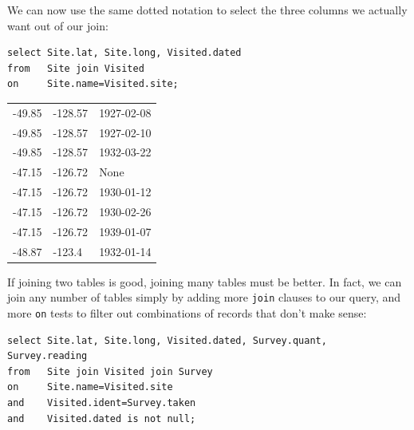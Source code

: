 \documentclass{book}
\begin{document}
We can now use the same dotted notation to select the three columns we
actually want out of our join:

\begin{verbatim}
select Site.lat, Site.long, Visited.dated
from   Site join Visited
on     Site.name=Visited.site;
\end{verbatim}

\begin{tabular}{lll}
-49.85 & -128.57 & 1927-02-08 \\
-49.85 & -128.57 & 1927-02-10 \\
-49.85 & -128.57 & 1932-03-22 \\
-47.15 & -126.72 & None \\
-47.15 & -126.72 & 1930-01-12 \\
-47.15 & -126.72 & 1930-02-26 \\
-47.15 & -126.72 & 1939-01-07 \\
-48.87 & -123.4 & 1932-01-14 \\
\end{tabular}

If joining two tables is good, joining many tables must be better. In
fact, we can join any number of tables simply by adding more
\texttt{join} clauses to our query, and more \texttt{on} tests to filter
out combinations of records that don't make sense:

\begin{verbatim}
select Site.lat, Site.long, Visited.dated, Survey.quant, Survey.reading
from   Site join Visited join Survey
on     Site.name=Visited.site
and    Visited.ident=Survey.taken
and    Visited.dated is not null;
\end{verbatim}
\end{document}
